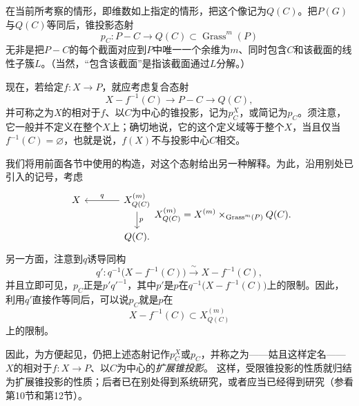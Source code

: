 在当前所考察的情形，即维数如上指定的情形，把这个像记为$Q(C)$。把$P(G)$与$Q(C)$等同后，锥投影态射
\[
p_C:P-C\longrightarrow Q(C)\subset\operatorname{Grass}^{m}(P)
\]
无非是把$P-C$的每个截面对应到$P$中唯一一个余维为$m$、同时包含$C$和该截面的线性子簇$L$。（当然，“包含该截面”是指该截面通过$L$分解。）

现在，若给定$f:X\to P$，就应考虑复合态射
\[
X-f^{-1}(C)\longrightarrow P-C\longrightarrow Q(C),
\]
并可称之为$X$的相对于$f$、以$C$为中心的锥投影，记为$p_C^X$，或简记为$p_C$。须注意，它一般并不定义在整个$X$上；确切地说，它的这个定义域等于整个$X$，当且仅当$f^{-1}(C)=\varnothing$，也就是说，$f(X)$不与投影中心$C$相交。

我们将用前面各节中使用的构造，对这个态射给出另一种解释。为此，沿用别处已引入的记号，考虑
\[
\begin{tikzcd}[column sep=large]
X & X^{(m)}_{Q(C)}\arrow[l,"q"']\arrow[d,"p"]\\
  & Q(C).
\end{tikzcd}
\qquad
X^{(m)}_{Q(C)}
 =X^{(m)}\times_{\operatorname{Grass}^{m}(P)}Q(C).
\]
另一方面，注意到$q$诱导同构
\[
q':q^{-1}\bigl(X-f^{-1}(C)\bigr)
 \xrightarrow{\ \sim\ }X-f^{-1}(C),
\]
并且立即可见，$p_C$正是$p'q'^{-1}$，其中$p'$是$p$在$q^{-1}\bigl(X-f^{-1}(C)\bigr)$上的限制。因此，利用$q'$直接作等同后，可以说$p_C$就是$p$在
\[
X-f^{-1}(C)\subset X^{(m)}_{Q(C)}
\]
上的限制。

因此，为方便起见，仍把上述态射记作$p_C^X$或$p_C$，并称之为——姑且这样定名——$X$的相对于$f:X\to P$、以$C$为中心的\emph{扩展锥投影}。
这样，受限锥投影的性质就归结为扩展锥投影的性质；后者已在别处得到系统研究，或者应当已经得到研究（参看第10节和第12节）。


